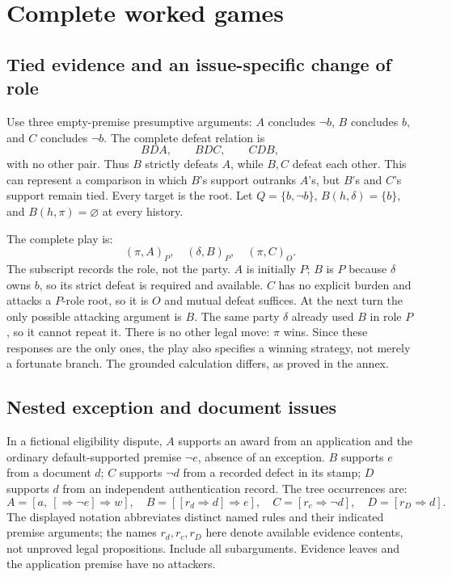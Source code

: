 \section{Complete worked games}
\label{sec:p18-lis-worked}

\subsection{Tied evidence and an issue-specific change of role}
\label{sec:p18-lis-tied-evidence}

Use three empty-premise presumptive arguments:
\(A\) concludes \(\neg b\), \(B\) concludes \(b\), and \(C\)
concludes \(\neg b\).
The complete defeat relation is
\[
BDA,\qquad BDC,\qquad CDB,
\]
with no other pair. Thus \(B\) strictly defeats \(A\), while
\(B,C\) defeat each other.
This can represent a comparison in which \(B\)'s support outranks
\(A\)'s, but \(B\)'s and \(C\)'s support remain tied.
Every target is the root.
Let \(Q=\{b,\neg b\}\), \(B(h,\delta)=\{b\}\), and
\(B(h,\pi)=\varnothing\) at every history.

The complete play is:
\[
(\pi,A)_P,\quad(\delta,B)_P,\quad(\pi,C)_O .
\]
The subscript records the role, not the party.
\(A\) is initially \(P\); \(B\) is \(P\) because \(\delta\)
owns \(b\), so its strict defeat is required and available.
\(C\) has no explicit burden and attacks a \(P\)-role root,
so it is \(O\) and mutual defeat suffices.
At the next turn the only possible attacking argument is \(B\).
The same party \(\delta\) already used \(B\) in role \(P\),
so it cannot repeat it. There is no other legal move:
\(\pi\) wins. Since these responses are the only ones, the play
also specifies a winning strategy, not merely a fortunate branch.
The grounded calculation differs, as proved in the annex.

\subsection{Nested exception and document issues}
\label{sec:p18-lis-document-issues}

In a fictional eligibility dispute, \(A\) supports an award from
an application and the ordinary default-supported premise
\(\neg e\), absence of an exception.
\(B\) supports \(e\) from a document \(d\);
\(C\) supports \(\neg d\) from a recorded defect in its stamp;
\(D\) supports \(d\) from an independent authentication record.
The tree occurrences are:
\[
A=[a,\ [\Rightarrow\neg e]\Rightarrow w],\quad
B=[[r_d\Rightarrow d]\Rightarrow e],\quad
C=[r_c\Rightarrow\neg d],\quad D=[r_D\Rightarrow d].
\]
The displayed notation abbreviates distinct named rules and their
indicated premise arguments; the names \(r_d,r_c,r_D\) here
denote available evidence contents, not unproved legal propositions.
Include all subarguments. Evidence leaves and the application
premise have no attackers.

